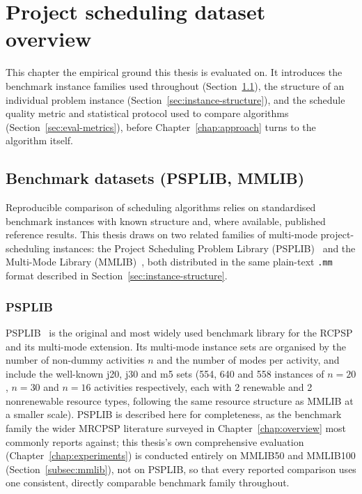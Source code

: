 \chapter{Project scheduling dataset overview}
\label{chap:dataset}

This chapter  the empirical ground this thesis is evaluated on. It
introduces the benchmark instance families used throughout
(Section~\ref{sec:benchmark-datasets}), the structure of an individual
problem instance (Section~\ref{sec:instance-structure}), and the schedule
quality metric and statistical protocol used to compare algorithms
(Section~\ref{sec:eval-metrics}), before Chapter~\ref{chap:approach} turns
to the algorithm itself.

\section{Benchmark datasets (PSPLIB, MMLIB)}
\label{sec:benchmark-datasets}

Reproducible comparison of scheduling algorithms relies on standardised
benchmark instances with known structure and, where available, published
reference results. This thesis draws on two related families of multi-mode
project-scheduling instances: the Project Scheduling Problem Library
(PSPLIB)~\cite{kolisch1997} and the Multi-Mode Library
(MMLIB)~\cite{vanpeteghem2014}, both distributed in the same plain-text
\texttt{.mm} format described in Section~\ref{sec:instance-structure}.

\subsection{PSPLIB}
\label{subsec:psplib}

PSPLIB~\cite{kolisch1997} is the original and most widely used benchmark
library for the RCPSP and its multi-mode extension. Its multi-mode instance
sets are organised by the number of non-dummy activities $n$ and the number
of modes per activity, and include the well-known j20, j30 and m5 sets
(554, 640 and 558 instances of $n=20$, $n=30$ and $n=16$ activities
respectively, each with 2 renewable and 2 nonrenewable resource types,
following the same resource structure as MMLIB at a smaller scale).
PSPLIB is described here for completeness, as the benchmark family the
wider MRCPSP literature surveyed in Chapter~\ref{chap:overview} most
commonly reports against; this thesis's own comprehensive evaluation
(Chapter~\ref{chap:experiments}) is conducted entirely on MMLIB50 and
MMLIB100 (Section~\ref{subsec:mmlib}), not on PSPLIB, so that every
reported comparison uses one consistent, directly comparable benchmark
family throughout.

